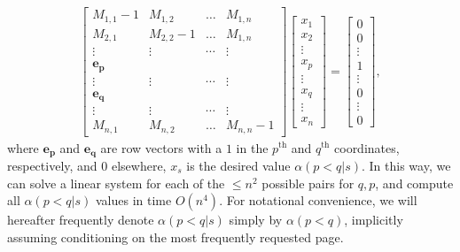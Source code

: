 \begin{align}
    \label{eqn:linear-system-for-alpha}
    \begin{bmatrix}
        M_{1,1} - 1 & M_{1,2} & \dots & M_{1,n} \\
        M_{2,1} & M_{2,2} -1 & \dots & M_{1,n} \\
        \vdots & \vdots & \cdots & \vdots\\
        \boldsymbol{e_p} \\
        \vdots & \vdots & \cdots &\vdots \\
        \boldsymbol{e_q} \\
        \vdots & \vdots & \cdots & \vdots \\
        M_{n,1} & M_{n,2} & \dots & M_{n,n}-1
    \end{bmatrix}
    \begin{bmatrix}
        x_1 \\ x_2 \\ \vdots \\ x_p \\ \vdots \\ x_q \\ \vdots \\ x_n
    \end{bmatrix} = 
    \begin{bmatrix}
        0 \\ 0 \\ \vdots \\ 1 \\ \vdots \\ 0 \\ \vdots \\ 0
    \end{bmatrix},
\end{align}
where $\boldsymbol{e_p}$ and $\boldsymbol{e_q}$ are row vectors with a $1$ in the $p^{\text{th}}$ and $q^{\text{th}}$ coordinates, respectively, and $0$ elsewhere, $x_s$ is the desired value $\alpha(p<q|s)$. %
In this way, we can solve a linear system for each of the $\le n^2$ possible pairs for $q,p$, and compute all $\alpha(p<q|s)$ values in time $O(n^4)$. For notational convenience, we will hereafter frequently denote $\alpha(p<q|s)$ simply by $\alpha(p<q)$, implicitly assuming conditioning on the most frequently requested page.


